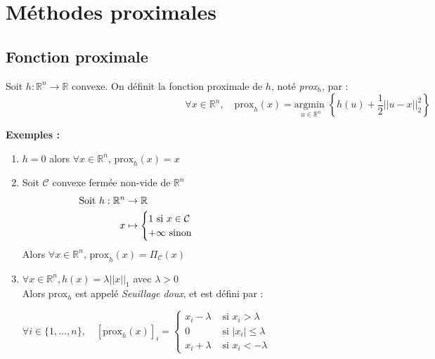 \documentclass[12pt,a4paper]{article}
\newcommand{\definition}[2]{%
    \begin{tcolorbox}[colback=white,colframe=blue!25!white,title=\textbf{Définition #1}, coltitle=black]
        #2
    \end{tcolorbox}
}
\begin{document}
\section{Méthodes proximales}

\subsection{Fonction proximale}

\definition{}{
    Soit $h : \mathbb{R}^n \rightarrow \mathbb{R}$ convexe. On définit la fonction proximale de $h$, noté \textit{prox}$_h$, par :
    $$
    \forall x \in \mathbb{R}^n, \quad \text{prox}_h(x) = \underset{u \in \mathbb{R}^n}{\text{argmin }} \left\{ h(u) + \frac{1}{2} ||u - x||_2^2 \right\}
    $$
}



\noindent\textbf{Exemples :}
\begin{enumerate}[label=\roman*)]
    \item $h = 0$ alors $\forall x \in \mathbb{R}^n$, $\text{prox}_h(x) = x$\\
    
    \item Soit $\mathcal{C}$ convexe fermée non-vide de $\mathbb{R}^n$
    \begin{align*}
        \text{Soit } h : \mathbb{R}^n &\rightarrow \mathbb{R} \hspace{14.5cm}\\
        x &\mapsto \begin{cases}
            1 \text{ si } x \in \mathcal{C}\\
            + \infty \text{ sinon}
        \end{cases}
    \end{align*}
    Alors $\forall x \in \mathbb{R}^n$, $\text{prox}_h(x) = \Pi_{\mathcal{C}}(x)$\\


    \item $\forall x \in \mathbb{R}^n, h(x) = \lambda ||x||_1$ avec $\lambda > 0$\\
    Alors prox$_h$ est appelé \textit{Seuillage doux}, et est défini par :
    \begin{tcolorbox}[colback=red!10!white,colframe=red!30!black]
        $\forall i \in \{1, \dots, n\}, \quad \left[ \text{prox}_h(x) \right]_i = \begin{cases}
            x_i - \lambda &\text{ si } x_i > \lambda\\
            0 &\text{ si } |x_i| \leq \lambda\\
            x_i + \lambda &\text{ si } x_i < -\lambda
        \end{cases}$
    \end{tcolorbox}

\end{enumerate}
\end{document}
